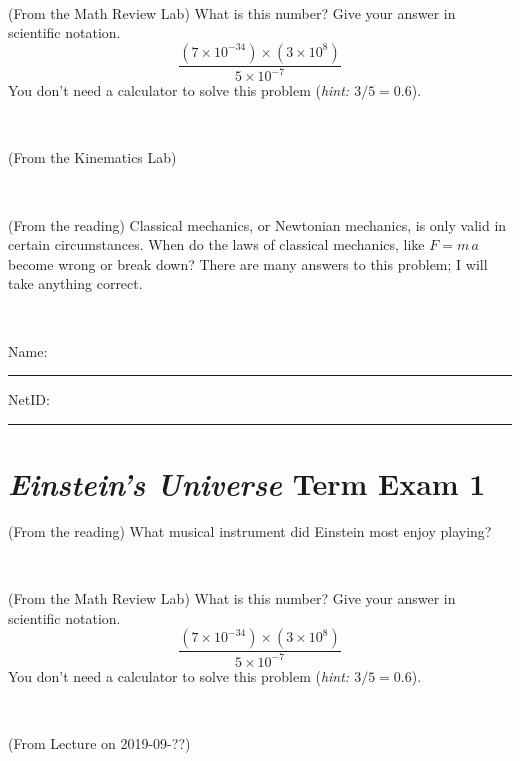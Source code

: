 \documentclass[12pt, letterpaper]{article}
\begin{document}
\vfill ~

\begin{problem} (From the Math Review Lab)
What is this number? Give your answer in scientific notation.
$$
\frac{(7\times10^{-34})\times(3\times10^8)}{5\times10^{-7}}
$$
You don't need a calculator to solve this problem (\textit{hint: $3/5=0.6$}).
\end{problem}


\vfill ~

\begin{problem} (From the Kinematics Lab)

\end{problem}


\vfill ~

\begin{problem} (From the reading)
Classical mechanics, or Newtonian mechanics, is only valid in certain
circumstances. When do the laws of classical mechanics, like $F =
m\,a$ become wrong or break down? There are many answers to this
problem; I will take anything correct.
\end{problem}


\vfill ~


\cleardoublepage



\noindent
Name: \rule[-1ex]{0.60\textwidth}{0.1pt}
NetID: \rule[-1ex]{0.20\textwidth}{0.1pt}

\section*{\textsl{Einstein's Universe} Term Exam 1}
\setcounter{problem}{1}


\begin{problem} (From the reading)
What musical instrument did Einstein most enjoy playing?
\end{problem}


\vfill ~

\begin{problem} (From the Math Review Lab)
What is this number? Give your answer in scientific notation.
$$
\frac{(7\times10^{-34})\times(3\times10^8)}{5\times10^{-7}}
$$
You don't need a calculator to solve this problem (\textit{hint: $3/5=0.6$}).
\end{problem}


\vfill ~

\begin{problem} (From Lecture on 2019-09-??)
\end{problem}
\end{document}
